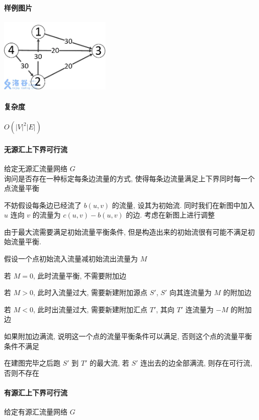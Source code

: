 \paragraph{样例图片}

\begin{center}
    \includegraphics[width=0.4\textwidth]{img/luogu-P3376-1.png}
\end{center}

\paragraph{复杂度} \(O\left(|V|^2|E|\right)\)

\paragraph{无源汇上下界可行流} 给定无源汇流量网络 \(G\)~\\

询问是否存在一种标定每条边流量的方式, 使得每条边流量满足上下界同时每一个点流量平衡

不妨假设每条边已经流了 \(b(u,v)\) 的流量, 设其为初始流. 同时我们在新图中加入 \(u\) 连向 \(v\) 的流量为 $c(u,v) - b(u,v)$ 的边. 考虑在新图上进行调整

由于最大流需要满足初始流量平衡条件, 但是构造出来的初始流很有可能不满足初始流量平衡.

假设一个点初始流入流量减初始流出流量为 \(M\)

若 \(M=0\), 此时流量平衡, 不需要附加边

若 \(M>0\), 此时入流量过大, 需要新建附加源点 \(S'\), \(S'\) 向其连流量为 \(M\) 的附加边

若 \(M<0\), 此时出流量过大, 需要新建附加汇点 \(T'\), 其向 \(T'\) 连流量为 \(-M\) 的附加边

如果附加边满流, 说明这一个点的流量平衡条件可以满足, 否则这个点的流量平衡条件不满足

在建图完毕之后跑 \(S'\) 到 \(T'\) 的最大流, 若 \(S'\) 连出去的边全部满流, 则存在可行流, 否则不存在

\paragraph{有源汇上下界可行流} 给定有源汇流量网络 \(G\)~\\

